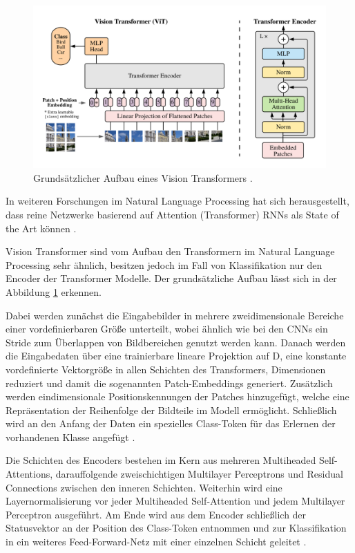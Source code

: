 \documentclass[twoside,a4paper]{IEEEtran}
\begin{document}
\begin{figure}[!htb]
	\centering
	\includegraphics[width=2.1\columnwidth]{vitimg}
	\caption{Grundsätzlicher Aufbau eines Vision Transformers \cite[S.3]{VIT}.}
	\label{vitimg}
\end{figure}


In weiteren Forschungen im Natural Language Processing hat sich herausgestellt, dass reine Netzwerke basierend auf Attention (Transformer) RNNs als State of the Art können \cite[S.2]{TRANSFORMERS}. 

Vision Transformer sind vom Aufbau den Transformern im Natural Language Processing sehr ähnlich, besitzen jedoch im Fall von Klassifikation nur den Encoder der Transformer Modelle. Der grundsätzliche Aufbau lässt sich in der Abbildung \ref{vitimg} erkennen.

Dabei werden zunächst die Eingabebilder in mehrere zweidimensionale Bereiche einer vordefinierbaren Größe unterteilt, wobei ähnlich wie bei den CNNs ein Stride zum Überlappen von Bildbereichen genutzt werden kann. Danach werden die Eingabedaten über eine trainierbare lineare Projektion auf D, eine konstante vordefinierte Vektorgröße in allen Schichten des Transformers, Dimensionen reduziert und damit die sogenannten Patch-Embeddings generiert. Zusätzlich werden eindimensionale Positionskennungen der Patches hinzugefügt, welche eine Repräsentation der Reihenfolge der Bildteile im Modell ermöglicht. Schließlich wird an den Anfang der Daten ein spezielles Class-Token für das Erlernen der vorhandenen Klasse angefügt \cite[S.3]{VIT}. 

Die Schichten des Encoders bestehen im Kern aus mehreren Multiheaded Self-Attentions, darauffolgende zweischichtigen Multilayer Perceptrons und Residual Connections zwischen den inneren Schichten. Weiterhin wird eine Layernormalisierung vor jeder Multiheaded Self-Attention und jedem Multilayer Perceptron ausgeführt. Am Ende wird aus dem Encoder schließlich der Statusvektor an der Position des Class-Token entnommen und zur Klassifikation in ein weiteres Feed-Forward-Netz mit einer einzelnen Schicht geleitet \cite[S.3-4]{VIT}. 
\end{document}
